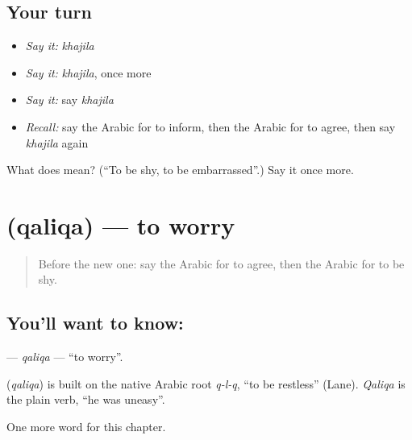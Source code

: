 \subsection*{Your turn}
\begin{itemize}
\raggedright
  \item \emph{Say it:} \emph{khajila}
  \item \emph{Say it:} \emph{khajila}, once more
  \item \emph{Say it:} say \emph{khajila}
  \item \emph{Recall:} say the Arabic for to inform, then the Arabic for to agree, then say \emph{khajila} again
\end{itemize}

\begin{tcolorbox}[breakable,colback=teal!4,colframe=teal!35!black,title={Before you move on}]
What does  mean? (\textquotedblleft{}To be shy, to be embarrassed\textquotedblright{}.) Say it once more.
\end{tcolorbox}
\section[\texorpdfstring{\ar{قلق} (qaliqa)}{قلق (qaliqa)}]{ (qaliqa) — to worry}

\label{lesson:AR-C227-qaliqa}



\begin{quote}
Before the new one: say the Arabic for to agree, then the Arabic for to be shy.
\end{quote}

\subsection*{You'll want to know: }
\textbf{} — \emph{qaliqa} — \textquotedblleft{}to worry\textquotedblright{}.

\begin{cousinweb}
\textbf{} (\emph{qaliqa}) is built on the native Arabic root \emph{q-l-q}, \textquotedblleft{}to be restless\textquotedblright{} (Lane). \emph{Qaliqa} is the plain verb, \textquotedblleft{}he was uneasy\textquotedblright{}.
\end{cousinweb}

\begin{grammarlens}[title={What you've built}]
One more word for this chapter.
\end{grammarlens}

